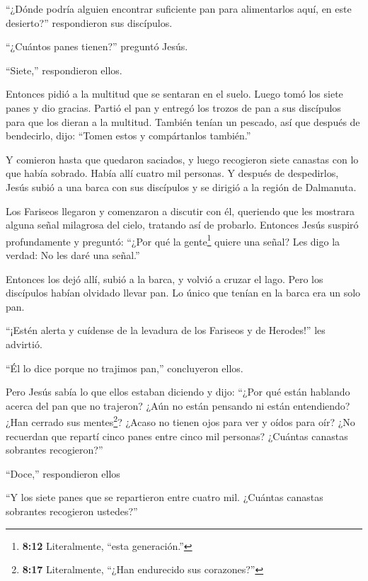  ``¿Dónde podría alguien encontrar suficiente pan para
alimentarlos aquí, en este desierto?'' respondieron sus discípulos.

 ``¿Cuántos panes tienen?'' preguntó Jesús.

``Siete,'' respondieron ellos.

 Entonces pidió a la multitud que se sentaran en el suelo.
Luego tomó los siete panes y dio gracias. Partió el pan y entregó los
trozos de pan a sus discípulos para que los dieran a la multitud.
 También tenían un pescado, así que después de bendecirlo,
dijo: ``Tomen estos y compártanlos también.''

 Y comieron hasta que quedaron saciados, y luego recogieron
siete canastas con lo que había sobrado.  Había allí cuatro
mil personas. Y después de despedirlos,  Jesús subió a una
barca con sus discípulos y se dirigió a la región de Dalmanuta.

 Los Fariseos llegaron y comenzaron a discutir con él,
queriendo que les mostrara alguna señal milagrosa del cielo, tratando
así de probarlo.  Entonces Jesús suspiró profundamente y
preguntó: ``¿Por qué la gente\footnote{\textbf{8:12} Literalmente,
  ``esta generación.''} quiere una señal? Les digo la verdad: No les
daré una señal.''

 Entonces los dejó allí, subió a la barca, y volvió a
cruzar el lago.  Pero los discípulos habían olvidado llevar
pan. Lo único que tenían en la barca era un solo pan.

 ``¡Estén alerta y cuídense de la levadura de los Fariseos
y de Herodes!'' les advirtió.

 ``Él lo dice porque no trajimos pan,'' concluyeron ellos.

 Pero Jesús sabía lo que ellos estaban diciendo y dijo:
``¿Por qué están hablando acerca del pan que no trajeron? ¿Aún no están
pensando ni están entendiendo? ¿Han cerrado sus mentes\footnote{\textbf{8:17}
  Literalmente, ``¿Han endurecido sus corazones?''}? 
¿Acaso no tienen ojos para ver y oídos para oír?  ¿No
recuerdan que repartí cinco panes entre cinco mil personas? ¿Cuántas
canastas sobrantes recogieron?''

``Doce,'' respondieron ellos

 ``Y los siete panes que se repartieron entre cuatro mil.
¿Cuántas canastas sobrantes recogieron ustedes?''

